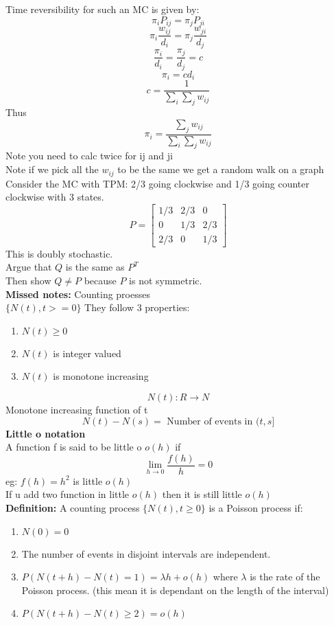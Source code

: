 \documentclass{article}
\begin{document}
Time reversibility for such an MC is given by:
$$\pi_i P_{ij} = \pi_j P_{ji}$$
$$\pi_i \frac{w_{ij}}{d_i} = \pi_j \frac{w_{ji}}{d_j}$$
$$\frac{\pi_i}{d_i} = \frac{\pi_j}{d_j} = c$$
$$ \pi_i = c d_i$$
$$ c = \frac{1}{\sum_i \sum_j w_{ij}}$$
Thus 
$$\pi_i = \frac{\sum_{j}w_{ij}}{\sum_i \sum_j w_{ij}}$$
Note you need to calc twice for ij and ji\\
Note if we pick all the $w_{ij} $ to be the same we get a random walk on a graph\\
Consider the MC with TPM:
2/3 going clockwise and 1/3 going counter clockwise with 3 states.\\
$$P = \begin{bmatrix}
    1/3 & 2/3 & 0 \\
    0 & 1/3 & 2/3 \\
    2/3 & 0 & 1/3
\end{bmatrix}$$
This is doubly stochastic.\\
Argue that $Q$ is the same as $P^T$\\
Then show $Q \neq P$ because $P$ is not symmetric.\\
\textbf{Missed notes:}
Counting proesses\\
$\{ N(t), t>=0 \}$
They follow 3 properties:
\begin{enumerate}
    \item $N(t) \geq 0$
    \item $N(t)$ is integer valued
    \item $N(t)$ is monotone increasing
\end{enumerate}
$$N(t): R \to N$$
Monotone increasing function of t\\
$$N(t) -N(s) = \text{ Number of events in } (t,s]$$
\textbf{Little o notation}\\
A function f is said to be little o $o(h)$ if\\
$$ \lim_{h \to 0} \frac{f(h)}{h} = 0$$
eg: $f(h) = h^2$ is little $o(h)$\\
If u add two function in little $o(h)$ then it is still little $o(h)$\\
\textbf{Definition:}
A counting process $\{N(t), t \geq 0\}$ is a Poisson process if:
\begin{enumerate}
    \item $N(0) = 0$
    \item The number of events in disjoint intervals are independent. 
    \item $P(N(t+h) - N(t) = 1) = \lambda h + o(h)$ where $\lambda$ is the rate of the Poisson process. (this mean it is dependant on the length of the interval)
    \item $P(N(t+h) - N(t) \geq 2) = o(h)$
\end{enumerate}
\end{document}

